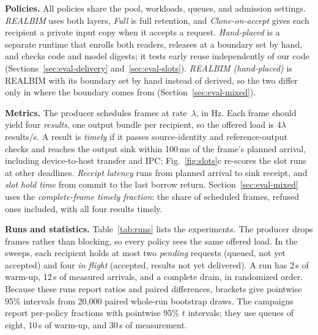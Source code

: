 \documentclass[conference]{IEEEtran}
\newcommand{\sys}{REALBIM}
\newcommand{\hps}{Hand-placed}
\newcommand{\hpr}{\sys{} (hand-placed)}
\newcommand{\ms}{\,ms}
\begin{document}
\textbf{Policies.} All policies share the pool, workloads, queues, and admission settings. \emph{\sys} uses both layers, \emph{Full} is full retention, and \emph{Clone-on-accept} gives each recipient a private input copy when it accepts a request. \emph{\hps} is a separate runtime that enrolls both readers, releases at a boundary set by hand, and checks code and model digests; it tests early reuse independently of our code (Sections~\ref{sec:eval-delivery} and~\ref{sec:eval-slots}). \emph{\hpr} is \sys{} with its boundary set by hand instead of derived, so the two differ only in where the boundary comes from (Section~\ref{sec:eval-mixed}).

\textbf{Metrics.} The producer schedules frames at rate~$\lambda$, in Hz. Each frame should yield four \emph{results}, one output bundle per recipient, so the offered load is $4\lambda$ results/s. A result is \emph{timely} if it passes source-identity and reference-output checks and reaches the output sink within 100\ms{} of the frame's planned arrival, including device-to-host transfer and IPC; Fig.~\ref{fig:slots}c re-scores the slot runs at other deadlines. \emph{Receipt latency} runs from planned arrival to sink receipt, and \emph{slot hold time} from commit to the last borrow return. Section~\ref{sec:eval-mixed} uses the \emph{complete-frame timely fraction}: the share of scheduled frames, refused ones included, with all four results timely.

\textbf{Runs and statistics.} Table~\ref{tab:runs} lists the experiments. The producer drops frames rather than blocking, so every policy sees the same offered load. In the sweeps, each recipient holds at most two \emph{pending} requests (queued, not yet accepted) and four \emph{in flight} (accepted, results not yet delivered). A run has 2\,s of warm-up, 12\,s of measured arrivals, and a complete drain, in randomized order. Because these runs report ratios and paired differences, brackets give pointwise 95\% intervals from 20,000 paired whole-run bootstrap draws. The campaigns report per-policy fractions with pointwise 95\% $t$ intervals; they use queues of eight, 10\,s of warm-up, and 30\,s of measurement.
\end{document}
